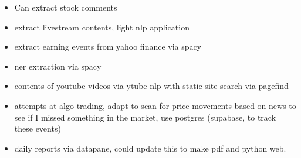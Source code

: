 \begin{itemize}
    \item Can extract stock comments
    \item extract livestream contents, light nlp application
    \item extract earning events from yahoo finance via spacy
    \item ner extraction via spacy
    \item contents of youtube videos via ytube nlp with static site search via pagefind
    \item attempts at algo trading, adapt to scan for price movements based on news to see if I missed something in the market, use postgres (supabase, to track these events)
    \item daily reports via datapane, could update this to make pdf and python web.
\end{itemize}